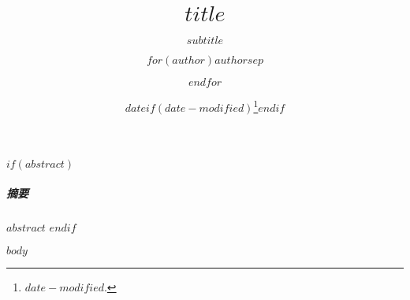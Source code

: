 \documentclass[fontset=fandol, zihao=5]{ctexart}
\title{$title$}
\subtitle{$subtitle$}
\author{$for(author)$$author$$sep$ \and $endfor$}
\date{$date$$if(date-modified)$\thanks{\transmodified \space $date-modified$.}$endif$}
\renewenvironment{abstract}{\subparagraph{摘要}\kaishu}{}
\theoremstyle{suncnthm}
\theoremstyle{definition}
\theoremstyle{remark}
\begin{document}
\maketitle

$if(abstract)$
\begin{abstract}
    $abstract$
\end{abstract}
$endif$

$body$

\printbibliography
\end{document}
